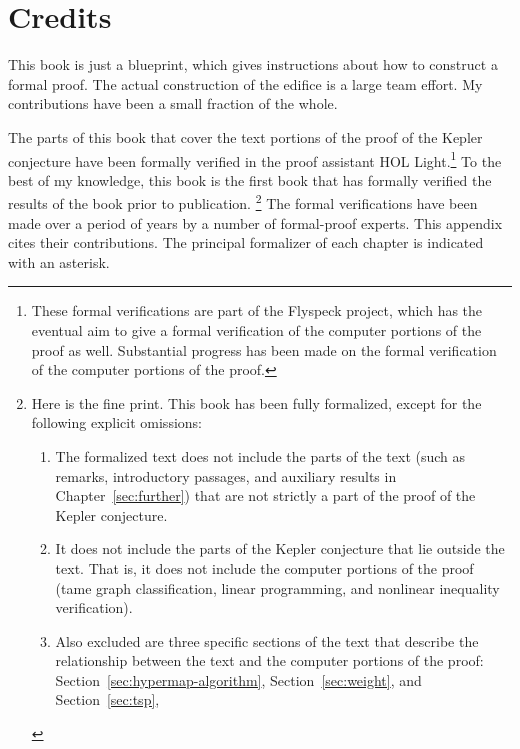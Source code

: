 
\chapter{Credits}\label{sec:credit}

This book is just a blueprint, which gives instructions about how to
construct a formal proof.  The actual construction of the edifice is a
large team effort.  My contributions have been a small fraction of the
whole.

The parts of this book that cover the text portions of the proof of
the Kepler conjecture have been formally verified in the proof
assistant HOL Light.\footnote{These formal verifications are part of
  the Flyspeck project, which has the eventual aim to give a formal
  verification of the computer portions of the proof as
  well. Substantial progress has been made on the formal verification
  of the computer portions of the proof.} 
To the best of my knowledge, this book is the first book
that has formally verified the results of the book
prior to publication.%
\footnote{ Here is the fine print.  This book has been fully
  formalized, except for the following explicit omissions:
\begin{enumerate}
\item The formalized text does not include the parts of the text (such
  as remarks, introductory passages, and auxiliary results in 
  Chapter~\ref{sec:further}) that are
  not strictly a part of the proof of the Kepler conjecture.
\item It does not include the parts of the Kepler conjecture that lie
  outside the text. That is, it does not include the computer portions
  of the proof (tame graph classification, linear programming, and
  nonlinear inequality verification).
\item Also excluded are three specific sections of the text that describe
  the relationship between the text and the computer portions of
  the proof: Section~\ref{sec:hypermap-algorithm}, Section~\ref{sec:weight}, and Section~\ref{sec:tsp},
\end{enumerate}
}
 The formal verifications
have been made over a period of years by a number of formal-proof
experts.  This appendix cites their contributions. The principal
formalizer of each chapter is indicated with an asterisk.

